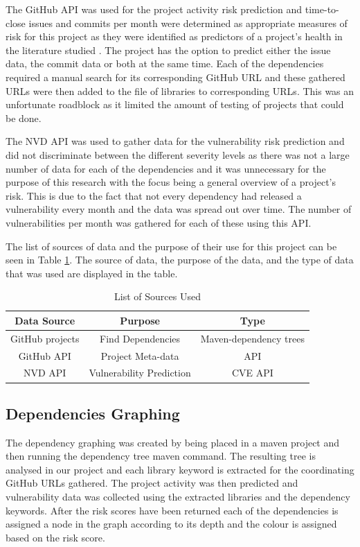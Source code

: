 \documentclass[conference]{IEEEtran}
\begin{document}
{The GitHub API was used for the project activity risk prediction and time-to-close issues and commits per month were determined as appropriate measures of risk for this project as they were identified as predictors of a project's health in the literature studied \cite{xia_predicting_2022}. The project has the option to predict either the issue data, the commit data or both at the same time. Each of the dependencies required a manual search for its corresponding GitHub URL and these gathered URLs were then added to the file of libraries to corresponding URLs. This was an unfortunate roadblock as it limited the amount of testing of projects that could be done. 

The NVD API was used to gather data for the vulnerability risk prediction and did not discriminate between the different severity levels as there was not a large number of data for each of the dependencies and it was unnecessary for the purpose of this research with the focus being a general overview of a project's risk. This is due to the fact that not every dependency had released a vulnerability every month and the data was spread out over time.  The number of vulnerabilities per month was gathered for each of these using this API. 

The list of sources of data and the purpose of their use for this project can be seen in Table \ref{sourcelist}. The source of data, the purpose of the data, and the type of data that was used are displayed in the table. 

\begin{table}
 \caption{List of Sources Used}
\label{sourcelist}
\begin{center}
\begin{tabular}{|c|c|c|}
\hline
    \textbf{Data Source} & \textbf{Purpose} & \textbf{Type} \\ \hline
    GitHub projects & Find Dependencies & Maven-dependency trees \\ \hline
    GitHub API & Project Meta-data & API  \\ \hline
    NVD API & Vulnerability Prediction & CVE API \\ \hline
\end{tabular}
\end{center}
\end{table}

\subsection{Dependencies Graphing}
The dependency graphing was created by being placed in a maven project and then running the dependency tree maven command. The resulting tree is analysed in our project and each library keyword is extracted for the coordinating GitHub URLs gathered. The project activity was then predicted and vulnerability data was collected using the extracted libraries and the dependency keywords. After the risk scores have been returned each of the dependencies is assigned a node in the graph according to its depth and the colour is assigned based on the risk score.

}
\end{document}
